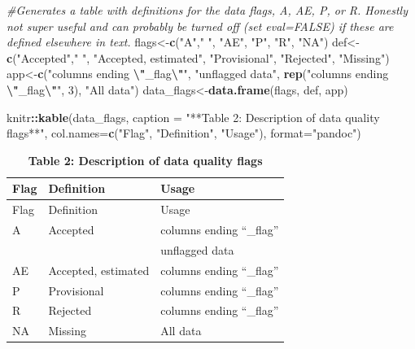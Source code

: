 \documentclass[
]{article}
\newenvironment{Shaded}{\begin{snugshade}}{\end{snugshade}}
\newcommand{\AttributeTok}[1]{\textcolor[rgb]{0.13,0.29,0.53}{#1}}
\newcommand{\CommentTok}[1]{\textcolor[rgb]{0.56,0.35,0.01}{\textit{#1}}}
\newcommand{\DecValTok}[1]{\textcolor[rgb]{0.00,0.00,0.81}{#1}}
\newcommand{\FunctionTok}[1]{\textcolor[rgb]{0.13,0.29,0.53}{\textbf{#1}}}
\newcommand{\NormalTok}[1]{#1}
\newcommand{\OtherTok}[1]{\textcolor[rgb]{0.56,0.35,0.01}{#1}}
\newcommand{\SpecialCharTok}[1]{\textcolor[rgb]{0.81,0.36,0.00}{\textbf{#1}}}
\newcommand{\StringTok}[1]{\textcolor[rgb]{0.31,0.60,0.02}{#1}}
\begin{document}
\begin{Shaded}
\begin{Highlighting}[]
\CommentTok{\#Generates a table with definitions for the data flags, A, AE, P, or R. Honestly not super useful and can probably be turned off (set eval=FALSE) if these are defined elsewhere in text.}
\NormalTok{flags}\OtherTok{\textless{}{-}}\FunctionTok{c}\NormalTok{(}\StringTok{"A"}\NormalTok{,}\StringTok{" "}\NormalTok{, }\StringTok{"AE"}\NormalTok{, }\StringTok{"P"}\NormalTok{, }\StringTok{"R"}\NormalTok{, }\StringTok{"NA"}\NormalTok{)}
\NormalTok{def}\OtherTok{\textless{}{-}}\FunctionTok{c}\NormalTok{(}\StringTok{"Accepted"}\NormalTok{,}\StringTok{" "}\NormalTok{, }\StringTok{"Accepted, estimated"}\NormalTok{, }\StringTok{"Provisional"}\NormalTok{, }\StringTok{"Rejected"}\NormalTok{, }\StringTok{"Missing"}\NormalTok{)}
\NormalTok{app}\OtherTok{\textless{}{-}}\FunctionTok{c}\NormalTok{(}\StringTok{"columns ending }\SpecialCharTok{\textbackslash{}"}\StringTok{\_flag}\SpecialCharTok{\textbackslash{}"}\StringTok{"}\NormalTok{, }\StringTok{"unflagged data"}\NormalTok{, }
       \FunctionTok{rep}\NormalTok{(}\StringTok{"columns ending }\SpecialCharTok{\textbackslash{}"}\StringTok{\_flag}\SpecialCharTok{\textbackslash{}"}\StringTok{"}\NormalTok{, }\DecValTok{3}\NormalTok{), }\StringTok{"All data"}\NormalTok{)}
\NormalTok{data\_flags}\OtherTok{\textless{}{-}}\FunctionTok{data.frame}\NormalTok{(flags, def, app)}

\NormalTok{knitr}\SpecialCharTok{::}\FunctionTok{kable}\NormalTok{(data\_flags, }\AttributeTok{caption =} \StringTok{"**Table 2: Description of data quality flags**"}\NormalTok{, }\AttributeTok{col.names=}\FunctionTok{c}\NormalTok{(}\StringTok{"Flag"}\NormalTok{, }\StringTok{"Definition"}\NormalTok{, }\StringTok{"Usage"}\NormalTok{), }\AttributeTok{format=}\StringTok{"pandoc"}\NormalTok{)}
\end{Highlighting}
\end{Shaded}

\begin{longtable}[]{@{}lll@{}}
\caption{\textbf{Table 2: Description of data quality
flags}}\tabularnewline
\toprule\noalign{}
Flag & Definition & Usage \\
\midrule\noalign{}
\endfirsthead
\toprule\noalign{}
Flag & Definition & Usage \\
\midrule\noalign{}
\endhead
\bottomrule\noalign{}
\endlastfoot
A & Accepted & columns ending ``\_flag'' \\
& & unflagged data \\
AE & Accepted, estimated & columns ending ``\_flag'' \\
P & Provisional & columns ending ``\_flag'' \\
R & Rejected & columns ending ``\_flag'' \\
NA & Missing & All data \\
\end{longtable}
\end{document}
